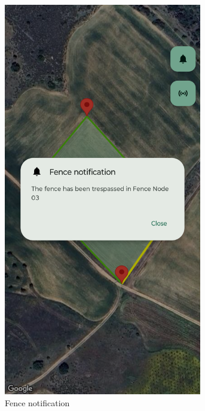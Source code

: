 \begin{enumerate}
\begin{figure}[H]
\begin{subfigure}[t]{0.3\textwidth}
                \includegraphics[width=0.95\textwidth]{images/8/14.png}
                \caption{Fence notification}
            \end{subfigure}
            \begin{subfigure}[t]{0.3\textwidth}
                \centering

\end{subfigure}
\end{figure}
\end{enumerate}
